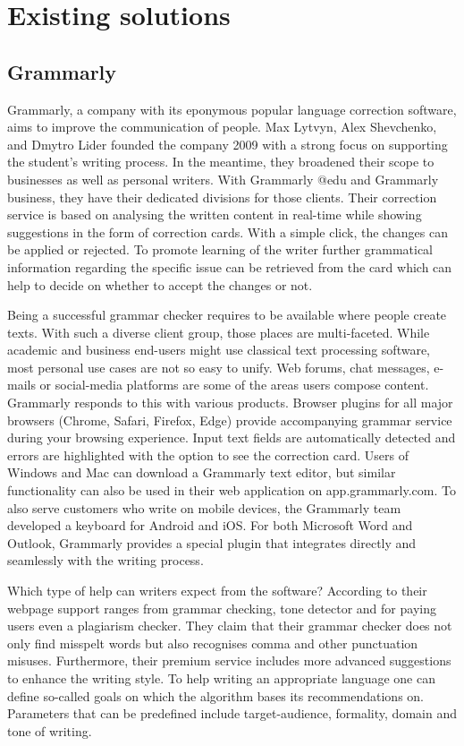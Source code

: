 \documentclass[runningheads]{llncs}
\begin{document}

\section{Existing solutions}
\subsection{Grammarly}
Grammarly, a company with its eponymous popular language correction software, aims to improve the communication of people. Max Lytvyn, Alex Shevchenko, and Dmytro Lider founded the company 2009 with a strong focus on supporting the student's writing process. In the meantime, they broadened their scope to businesses as well as personal writers. With Grammarly @edu and Grammarly business, they have their dedicated divisions for those clients. Their correction service is based on analysing the written content in real-time while showing suggestions in the form of correction cards.  With a simple click, the changes can be applied or rejected. To promote learning of the writer further grammatical information regarding the specific issue can be retrieved from the card which can help to decide on whether to accept the changes or not. \citep{noauthor_write_nodate}

Being a successful grammar checker requires to be available where people create texts. With such a diverse client group, those places are multi-faceted. While academic and business end-users might use classical text processing software, most personal use cases are not so easy to unify. Web forums, chat messages, e-mails or social-media platforms are some of the areas users compose content. Grammarly responds to this with various products. Browser plugins for all major browsers (Chrome, Safari, Firefox, Edge) provide accompanying grammar service during your browsing experience. Input text fields are automatically detected and errors are highlighted with the option to see the correction card. Users of Windows and Mac can download a Grammarly text editor, but similar functionality can also be used in their web application on app.grammarly.com. To also serve customers who write on mobile devices, the Grammarly team developed a keyboard for Android and iOS. For both Microsoft Word and Outlook, Grammarly provides a special plugin that integrates directly and seamlessly with the writing process.

Which type of help can writers expect from the software? According to their webpage \parencite{noauthor_write_nodate} support ranges from grammar checking, tone detector and for paying users even a plagiarism checker. They claim that their grammar checker does not only find misspelt words but also recognises comma and other punctuation misuses. Furthermore, their premium service includes more advanced suggestions to enhance the writing style. To help writing an appropriate language one can define so-called goals on which the algorithm bases its recommendations on. Parameters that can be predefined include target-audience, formality, domain and tone of writing.   
\end{document}
